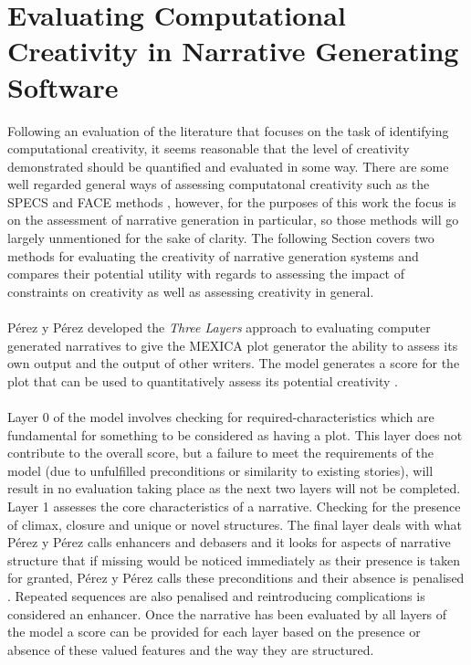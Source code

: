 \documentclass[letterpaper]{article}
\begin{document}
\section{Evaluating Computational Creativity in Narrative Generating Software} \label{sec:eval}
Following an evaluation of the literature that focuses on the task of identifying computational creativity, it seems reasonable that the level of creativity demonstrated should be quantified and evaluated in some way. There are some well regarded general ways of assessing computatonal creativity such as the SPECS and FACE methods , however, for the purposes of this work the focus is on the assessment of narrative generation in particular, so those methods will go largely unmentioned for the sake of clarity. The following Section covers two methods for evaluating the creativity of narrative generation systems and compares their potential utility with regards to assessing the impact of constraints on creativity as well as assessing creativity in general.\\
\\P\'erez y P\'erez developed the \emph{Three Layers} approach to evaluating computer generated narratives to give the MEXICA plot generator the ability to assess its own output and the output of other writers. The model generates a score for the plot that can be used to quantitatively assess its potential creativity .\\ 
\\Layer 0 of the model involves checking for required-characteristics  which are fundamental for something to be considered as having a plot. This layer does not contribute to the overall score, but a failure to meet the requirements of the model (due to unfulfilled preconditions or similarity to existing stories), will result in no evaluation taking place as the next two layers will not be completed. Layer 1 assesses the core characteristics of a narrative. Checking for the presence of climax, closure and unique or novel structures. The final layer deals with what P\'erez y P\'erez calls enhancers and debasers and it looks for aspects of narrative structure that if missing would be noticed immediately as their presence is taken for granted, P\'erez y P\'erez calls these preconditions and their absence is  penalised . Repeated sequences are also penalised and reintroducing complications is considered an enhancer. Once the narrative has been evaluated by all layers of the model a score can be provided for each layer based on the presence or absence of these valued features and the way they are structured.\\
\end{document}
